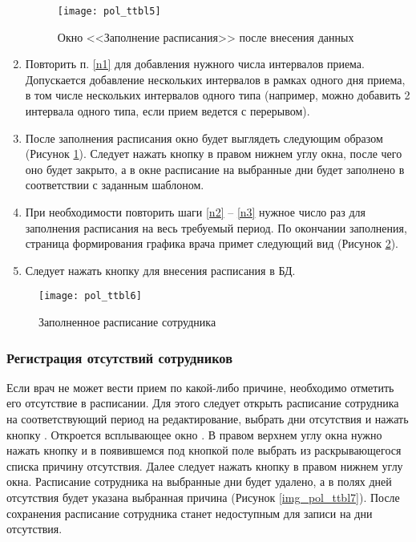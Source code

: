 \begin{enumerate}
\begin{figure}[ht]\centering
 \texttt{[image: pol\_ttbl5]}
 \caption{Окно <<Заполнение расписания>> после внесения данных}
 \label{img_pol_ttbl5}
\end{figure}

 \item Повторить п. \ref{n1} для добавления нужного числа интервалов приема. Допускается добавление нескольких интервалов в рамках одного дня приема, в том числе нескольких интервалов одного типа (например, можно добавить 2 интервала одного типа, если прием ведется с перерывом). 

 \item \label{n3} После заполнения расписания окно будет выглядеть следующим образом (Рисунок \ref{img_pol_ttbl5}). Следует нажать кнопку  в правом нижнем углу окна, после чего оно будет закрыто, а в окне  расписание на выбранные дни будет заполнено в соответствии с заданным шаблоном. 
 \item При необходимости повторить шаги \ref{n2} -- \ref{n3} нужное число раз для заполнения расписания на весь требуемый период. По окончании заполнения, страница формирования графика врача примет следующий вид (Рисунок \ref{img_pol_ttbl6}). 
 \item Следует нажать кнопку  для внесения расписания в БД. 
\end{enumerate}

\begin{figure}[ht]\centering
 \texttt{[image: pol\_ttbl6]}
 \caption{Заполненное расписание сотрудника}
 \label{img_pol_ttbl6}
\end{figure}

\subsubsection{Регистрация отсутствий сотрудников}

Если врач не может вести прием по какой-либо причине, необходимо отметить его отсутствие в расписании. Для этого следует открыть расписание сотрудника на соответствующий период на редактирование, выбрать дни отсутствия и нажать кнопку . Откроется всплывающее окно . В правом верхнем углу окна нужно нажать кнопку  и в появившемся под кнопкой поле выбрать из раскрывающегося списка причину отсутствия. Далее следует нажать кнопку  в правом нижнем углу окна. Расписание сотрудника на выбранные дни будет удалено, а в полях дней отсутствия будет указана выбранная причина (Рисунок \ref{img_pol_ttbl7}). После сохранения  расписание сотрудника станет недоступным для записи на дни отсутствия.

